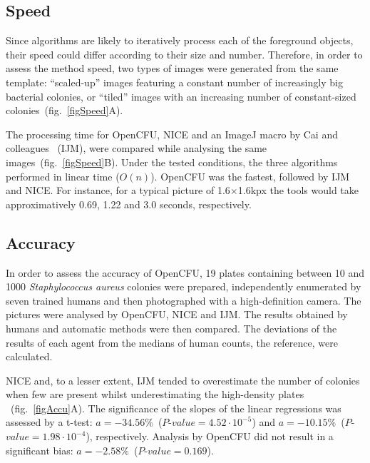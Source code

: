 \documentclass[10pt]{article}
\newcommand{\n}{seven}
\newcommand{\sa}{\emph{Staphylococcus aureus}}
\newcommand{\IJM}{IJM}
\begin{document}
\subsection*{Speed}
Since algorithms are likely to iteratively process each of the foreground
objects, their speed could differ according to their size and number.
Therefore, in order to assess the method speed,  two types of images were
generated from the same template:
``scaled-up'' images featuring a constant number of increasingly big bacterial
colonies, or ``tiled'' images with an increasing number of constant-sized
colonies~(fig.~\ref{figSpeed}A).

The processing time for OpenCFU, NICE\cite{clarke_lowcost_2010} and an ImageJ macro by Cai and colleagues
\cite{cai_optimized_2011}~(\IJM{}),
were compared while analysing the same images~(fig.~\ref{figSpeed}B). Under the
tested conditions, the three algorithms performed in linear time ($O(n)$).
OpenCFU was the fastest, followed by \IJM{} and NICE.
For instance, for a typical picture of 1.6$\times{}$1.6kpx the tools would take
approximatively 0.69, 1.22 and 3.0 seconds, respectively.

\subsection*{Accuracy} 
In order to assess the accuracy of OpenCFU, 19 plates
containing between 10 and 1000 \sa{} colonies were prepared, independently
enumerated by \n{} trained humans and then photographed with a high-definition camera.
The pictures were analysed by OpenCFU, NICE and \IJM{}.
The results obtained by humans and automatic methods were then compared.
The deviations of the results of each
agent from the medians of human counts, the reference, were
calculated.

NICE and, to a lesser extent, \IJM{} tended to overestimate the number of
colonies when few are present
whilst underestimating the high-density
plates 
~(fig.~\ref{figAccu}A). The significance of the slopes of the linear
regressions was assessed by a t-test:
$a = -34.56\%$~($P$-$value = 4.52 \cdot 10^{-5}$) and $a = -10.15\%$~($P$-$value =
1.98  \cdot 10^{-4}$), respectively. Analysis by OpenCFU did not result
in a significant bias: $a = -2.58\%$~($P$-$value = 0.169$).
\end{document}
